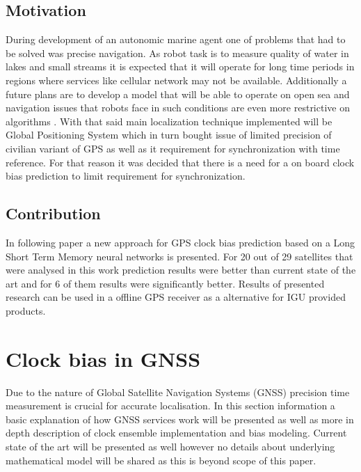 \documentclass{article}
\begin{document}
\subsection{Motivation}
During development of an autonomic marine agent one of problems that had to be solved was 
precise navigation. As robot task is to measure quality of water in lakes and small streams
it is expected that it will operate for long time periods in regions where services like 
cellular network may not be available. Additionally a future plans are to develop a model that
will be able to operate on open sea and navigation issues that robots face in such conditions
are even more restrictive on algorithms \cite{Cabrera2014}. 
With that said main localization technique implemented
will be Global Positioning System which in turn bought issue of limited precision of civilian
variant of GPS as well as it requirement for synchronization with time reference.
For that reason it was decided that there is a need for a on board clock bias prediction to limit
requirement for synchronization.

\subsection{Contribution}
In following paper a new approach for GPS clock bias prediction based on a Long Short Term Memory
neural networks is presented. For 20 out of 29 satellites that were analysed in this work 
prediction results were better than current state of the art and for 6 of them results were
significantly better. Results of presented research can be used in a offline GPS receiver as 
a alternative for IGU provided products.


\FloatBarrier
\section{Clock bias in GNSS}
Due to the nature of Global Satellite Navigation Systems (GNSS) 
precision time measurement is crucial for accurate localisation.
In this section information a basic explanation of how GNSS services work will be presented
as well as more in depth description of clock ensemble implementation and bias modeling.
Current state of the art will be presented as well however no details about underlying 
mathematical model will be shared as this is beyond scope of this paper.
\end{document}
